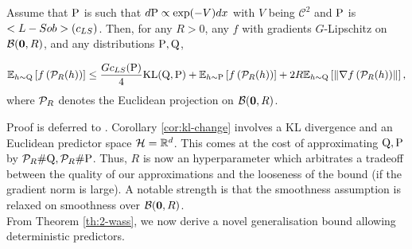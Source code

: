 \begin{corollary}
  \label{cor:kl-change}
  Assume that $\P$ is such that $d\P \propto \exp(-V)dx$ with $V$ being $\mathcal{C}^2$ and $\P$ is $\Lsob(c_{LS})$. Then, for any $R>0$, any $f$ with gradients $G$-Lipschitz on $\Bcal(\zerobf,R)$, and any distributions $\P,\Q$, 

  \[ \mathbb{E}_{h\sim \Q}\LB f\LP\Pcal_R(h)\RP \RB \leq \frac{Gc_{LS}(\P)}{4}\KL(\Q,\P) + \mathbb{E}_{h\sim \P}\LB f\LP\Pcal_R(h)\RP \RB + 2R\mathbb{E}_{h\sim \Q} \LB \LM\nabla f \LP\Pcal_R(h)  \RP \RM \RB,  \]
  where $\Pcal_R$ denotes the Euclidean projection on $\Bcal(\zerobf,R)$.
\end{corollary}
Proof is deferred to .
Corollary \ref{cor:kl-change} involves a KL divergence and an Euclidean predictor space $\Hcal= \Rbb^d$. This comes at the cost of approximating $\Q,\P$ by $\Pcal_R\#\Q,\Pcal_R\#\P$. Thus, $R$ is now an hyperparameter which arbitrates a tradeoff between the quality of our approximations and the looseness of the bound (if the gradient norm is large). A notable strength is that the smoothness assumption is relaxed on smoothness over $\Bcal(\zerobf,R)$.
\\

\noindent{}From Theorem \ref{th:2-wass}, we now derive a novel generalisation bound allowing deterministic predictors.

